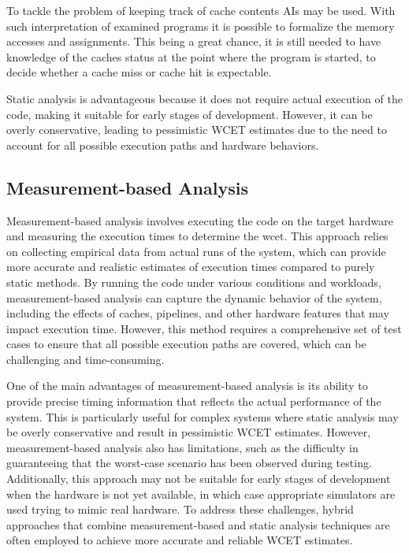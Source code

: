 To tackle the problem of keeping track of cache contents \ac{AI}s may be used.
With such interpretation of examined programs it is possible to formalize the memory accesses and assignments\cite{cousotAbstractInterpretationUnified1977}.
This being a great chance, it is still needed to have knowledge of the caches status at the point where the program is started, to decide whether a cache miss or cache hit is expectable. 

Static analysis is advantageous because it does not require actual execution of the code, making it suitable for early stages of development. However, it can be overly conservative, leading to pessimistic WCET estimates due to the need to account for all possible execution paths and hardware behaviors.

\subsection{Measurement-based Analysis}\label{sec:measurement_analysis}
Measurement-based analysis involves executing the code on the target hardware and measuring the execution times to determine the \ac{wcet}. 
This approach relies on collecting empirical data from actual runs of the system, which can provide more accurate and realistic estimates of execution times compared to purely static methods. 
By running the code under various conditions and workloads, measurement-based analysis can capture the dynamic behavior of the system, including the effects of caches, pipelines, and other hardware features that may impact execution time.
However, this method requires a comprehensive set of test cases to ensure that all possible execution paths are covered, which can be challenging and time-consuming\cite{wilhelmWorstcaseExecutiontimeProblem2008}.

One of the main advantages of measurement-based analysis is its ability to provide precise timing information that reflects the actual performance of the system. 
This is particularly useful for complex systems where static analysis may be overly conservative and result in pessimistic WCET estimates.
However, measurement-based analysis also has limitations, such as the difficulty in guaranteeing that the worst-case scenario has been observed during testing. 
Additionally, this approach may not be suitable for early stages of development when the hardware is not yet available, in which case appropriate simulators are used trying to mimic real hardware.\cite{wilhelmWorstcaseExecutiontimeProblem2008}
To address these challenges, hybrid approaches that combine measurement-based and static analysis techniques are often employed to achieve more accurate and reliable WCET estimates\cite{kelterWCETAnalysisOptimization}.

